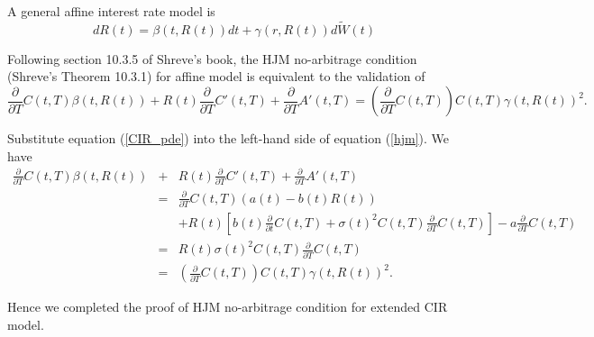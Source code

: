 \documentclass[6pt]{article}
\numberwithin{equation}{section}
\begin{document}
A general affine interest rate model is
$$
d R(t) = \beta(t,R(t))dt + \gamma(r,R(t)) d\tilde{W}(t)
$$

Following section 10.3.5 of Shreve's book, the HJM no-arbitrage condition (Shreve's Theorem 10.3.1) for affine model is equivalent to the validation of
\begin{equation}
\frac{\partial}{\partial T} C(t,T) \beta(t, R(t)) + R(t) \frac{\partial}{\partial T} C'(t,T) + \frac{\partial}{\partial T} A'(t,T) = \left(\frac{\partial}{\partial T} C(t,T)\right) C(t,T) \gamma(t,R(t))^2. \label{hjm}
\end{equation}

Substitute equation (\ref{CIR_pde}) into the left-hand side of equation (\ref{hjm}). We have
\begin{eqnarray*}
\frac{\partial}{\partial T} C(t,T) \beta(t, R(t)) &+& R(t) \frac{\partial}{\partial T} C'(t,T) + \frac{\partial}{\partial T} A'(t,T) \\
&=& \frac{\partial}{\partial T} C(t,T) (a(t)-b(t)R(t)) \\
& & + R(t)[b(t) \frac{\partial}{\partial t} C(t,T) + \sigma(t)^2 C(t,T)\frac{\partial}{\partial T}C(t,T)] -a \frac{\partial}{\partial T}C(t,T) \\
&=& R(t)\sigma(t)^2  C(t,T)\frac{\partial}{\partial T} C(t,T) \\
&=& \left(\frac{\partial}{\partial T} C(t,T)\right) C(t,T) \gamma(t,R(t))^2.
\end{eqnarray*}

Hence we completed the proof of HJM no-arbitrage condition for extended CIR model.
\end{document}

